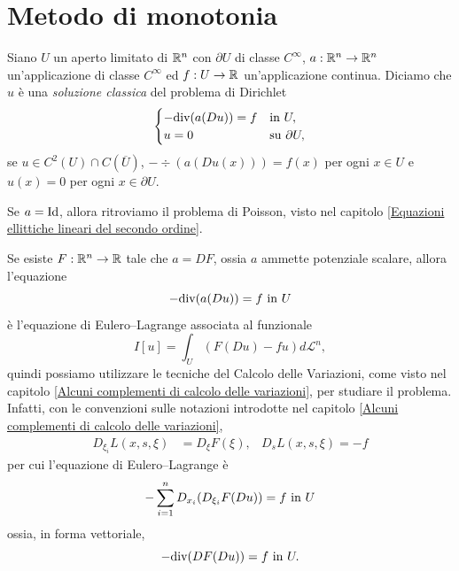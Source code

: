 \section{Metodo di monotonia}
\begin{definizione}
	Siano $U$ un aperto limitato di $\R^n$ con $\partial U$ di classe $C^\infty$, $a: \R^n \to \R^n$ un'applicazione di classe $C^\infty$ ed $f: U \to \R$ un'applicazione continua. Diciamo che $u$ è una \emph{soluzione classica} del problema di Dirichlet
	\[ 	\begin{cases}
		-\div(a(Du)) = f & \textup{in } U,\\
		u = 0 & \textup{su } \partial U,
	\end{cases} \]
	se $u \in C^2(U)\cap C(\overline{U})$, $-\div(a(Du(x))) = f(x)$ per ogni $x \in U$ e $u(x) = 0$ per ogni $x \in \partial U$.
\end{definizione}
\begin{osservazione}
	Se $a = \textup{Id}$, allora ritroviamo il problema di Poisson, visto nel capitolo \ref{Equazioni ellittiche lineari del secondo ordine}.
\end{osservazione}
\begin{osservazione}
	Se esiste $F: \R^n \to \R$ tale che $a = DF$, ossia $a$ ammette potenziale scalare, allora l'equazione 
	\[ -\div(a(Du)) = f  \textup{ in } U \]
	è l'equazione di Eulero--Lagrange associata al funzionale
	\[ I[u] = \int_U (F(Du) - fu) d\mathcal{L}^n, \]
	quindi possiamo utilizzare le tecniche del Calcolo delle Variazioni, come visto nel capitolo \ref{Alcuni complementi di calcolo delle variazioni}, per studiare il problema. Infatti, con le convenzioni sulle notazioni introdotte nel capitolo \ref{Alcuni complementi di calcolo delle variazioni},
	\begin{align*}
		D_{\xi_i}L(x,s,\xi) &= D_\xi F(\xi), & D_s L(x,s,\xi) = -f
	\end{align*}
	per cui l'equazione di Eulero--Lagrange è 
	\[ -\sum_{i=1}^{n} D_{x_i}(D_{\xi_i}F(Du)) = f  \textup{ in } U \]
	ossia, in forma vettoriale,
	\[ -\div(DF(Du)) = f  \textup{ in } U. \]
\end{osservazione}

